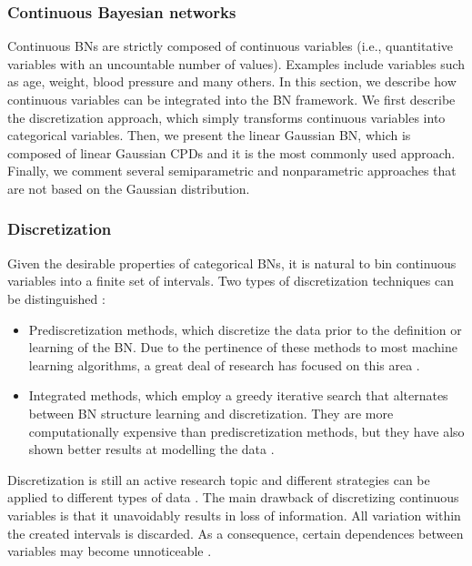
\subsubsection{Continuous Bayesian networks}
Continuous BNs are strictly composed of continuous variables (i.e., quantitative variables with an uncountable number of values). Examples include variables such as age, weight, blood pressure and many others. In this section, we describe how continuous variables can be integrated into the BN framework. We first describe the discretization approach, which simply transforms continuous variables into categorical variables. Then, we present the linear Gaussian BN, which is composed of linear Gaussian CPDs and it is the most commonly used approach. Finally, we comment several semiparametric and nonparametric approaches that are not based on the Gaussian distribution.

\subsubsection*{Discretization}
Given the desirable properties of categorical BNs, it is natural to bin continuous variables into a finite set of intervals. Two types of discretization techniques can be distinguished \citep{fu2005}:
\begin{itemize}
	\item Prediscretization methods, which discretize the data prior to the definition or learning of the BN. Due to the pertinence of these methods to most machine learning algorithms, a great deal of research has focused on this area \citep{liu2002}.
	\item Integrated methods, which employ a greedy iterative search that alternates between BN structure learning and discretization. They are more computationally expensive than prediscretization methods, but they have also shown better results at modelling the data \citep{friedman1996_disc, monti1999}.
\end{itemize}

Discretization is still an active research topic and different strategies can be applied to different types of data \citep{nojavan2017, beuzen2018}. The main drawback of discretizing continuous variables is that it unavoidably results in loss of information. All variation within the created intervals is discarded. As a consequence, certain dependences between variables may become unnoticeable \citep{friedman2000_disc}.

